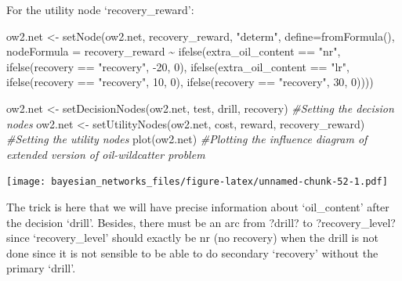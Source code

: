 \documentclass[
]{article}
\newenvironment{Shaded}{\begin{snugshade}}{\end{snugshade}}
\newcommand{\AttributeTok}[1]{\textcolor[rgb]{0.77,0.63,0.00}{#1}}
\newcommand{\CommentTok}[1]{\textcolor[rgb]{0.56,0.35,0.01}{\textit{#1}}}
\newcommand{\DecValTok}[1]{\textcolor[rgb]{0.00,0.00,0.81}{#1}}
\newcommand{\FunctionTok}[1]{\textcolor[rgb]{0.00,0.00,0.00}{#1}}
\newcommand{\NormalTok}[1]{#1}
\newcommand{\OtherTok}[1]{\textcolor[rgb]{0.56,0.35,0.01}{#1}}
\newcommand{\SpecialCharTok}[1]{\textcolor[rgb]{0.00,0.00,0.00}{#1}}
\newcommand{\StringTok}[1]{\textcolor[rgb]{0.31,0.60,0.02}{#1}}
\begin{document}
For the utility node `recovery\_reward':

\begin{Shaded}
\begin{Highlighting}[]
\NormalTok{ow2.net }\OtherTok{\textless{}{-}} \FunctionTok{setNode}\NormalTok{(ow2.net, recovery\_reward, }\StringTok{"determ"}\NormalTok{, }\AttributeTok{define=}\FunctionTok{fromFormula}\NormalTok{(),}
                  \AttributeTok{nodeFormula =}\NormalTok{ recovery\_reward }\SpecialCharTok{\textasciitilde{}} \FunctionTok{ifelse}\NormalTok{(extra\_oil\_content }\SpecialCharTok{==} \StringTok{"nr"}\NormalTok{,}
                                                         \FunctionTok{ifelse}\NormalTok{(recovery }\SpecialCharTok{==} \StringTok{"recovery"}\NormalTok{, }\SpecialCharTok{{-}}\DecValTok{20}\NormalTok{, }\DecValTok{0}\NormalTok{),}
                                                         \FunctionTok{ifelse}\NormalTok{(extra\_oil\_content }\SpecialCharTok{==} \StringTok{"lr"}\NormalTok{,}
                                                                \FunctionTok{ifelse}\NormalTok{(recovery }\SpecialCharTok{==} \StringTok{"recovery"}\NormalTok{, }\DecValTok{10}\NormalTok{, }\DecValTok{0}\NormalTok{),}
                                                                \FunctionTok{ifelse}\NormalTok{(recovery }\SpecialCharTok{==} \StringTok{"recovery"}\NormalTok{, }\DecValTok{30}\NormalTok{, }\DecValTok{0}\NormalTok{))))}

\NormalTok{ow2.net }\OtherTok{\textless{}{-}} \FunctionTok{setDecisionNodes}\NormalTok{(ow2.net, test, drill, recovery) }\CommentTok{\#Setting the decision nodes}
\NormalTok{ow2.net }\OtherTok{\textless{}{-}} \FunctionTok{setUtilityNodes}\NormalTok{(ow2.net, cost, reward, recovery\_reward) }\CommentTok{\#Setting the utility nodes}
\FunctionTok{plot}\NormalTok{(ow2.net) }\CommentTok{\#Plotting the influence diagram of extended version of oil{-}wildcatter problem}
\end{Highlighting}
\end{Shaded}

\texttt{[image: bayesian\_networks\_files/figure-latex/unnamed-chunk-52-1.pdf]}

The trick is here that we will have precise information about `oil\_content' after the decision `drill'.
Besides, there must be an arc from ?drill? to ?recovery\_level? since `recovery\_level' should exactly be nr (no recovery) when the drill is not done since it is not sensible to be able to do secondary `recovery' without the primary `drill'.
\end{document}
